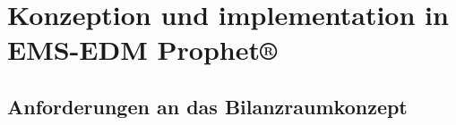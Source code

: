\documentclass[a4paper,10pt,twoside]{report}
\begin{document}
\chapter{Konzeption und implementation in EMS-EDM Prophet®}
\section{Anforderungen an das Bilanzraumkonzept}







\end{document}
